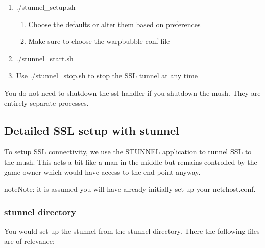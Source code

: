 \documentclass[letterpaper,10pt,english]{sphinxmanual}
\begin{document}
\begin{enumerate}
\item {} 
\sphinxAtStartPar
./stunnel\_setup.sh
\begin{enumerate}
%
\item {} 
\sphinxAtStartPar
Choose the defaults or alter them based on preferences

\item {} 
\sphinxAtStartPar
Make sure to choose the warpbubble conf file

\end{enumerate}

\item {} 
\sphinxAtStartPar
./stunnel\_start.sh

\item {} 
\sphinxAtStartPar
Use ./stunnel\_stop.sh to stop the SSL tunnel at any time

\end{enumerate}

\sphinxAtStartPar
You do not need to shutdown the ssl handler if you shutdown the mush.  They
are entirely separate processes.


\subsection{Detailed SSL setup with stunnel}
\label{\detokenize{security:detailed-ssl-setup-with-stunnel}}
\sphinxAtStartPar
To setup SSL connectivity, we use the STUNNEL application to tunnel SSL to
the mush.  This acts a bit like a man in the middle but remains controlled
by the game owner which would have access to the end point anyway.

\begin{sphinxadmonition}{note}{Note:}
\sphinxAtStartPar
it is assumed you will have already initially set up your netrhost.conf.
\end{sphinxadmonition}


\subsubsection{stunnel directory}
\label{\detokenize{security:stunnel-directory}}
\sphinxAtStartPar
You would set up the stunnel from the \textquotesingle{}stunnel\textquotesingle{} directory.  There the following
files are of relevance:
\end{document}
